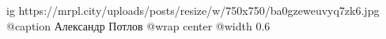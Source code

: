  
 
 
 
 

\ifcmt
  ig https://mrpl.city/uploads/posts/resize/w/750x750/ba0gzeweuvyq7zk6.jpg
	@caption Александр Потлов
  @wrap center
  @width 0.6
\fi
